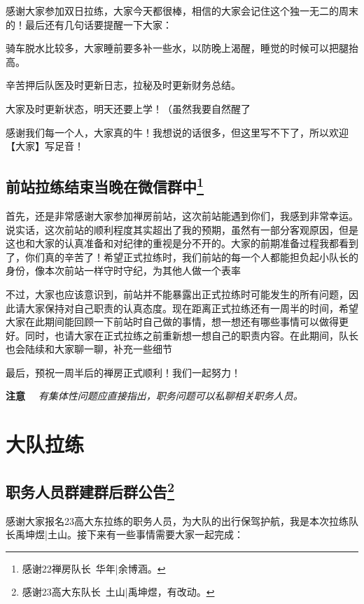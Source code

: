 \documentclass[UTF8]{ctexart}
\begin{document}
感谢大家参加双日拉练，大家今天都很棒，相信的大家会记住这个独一无二的周末的！最后还有几句话要提醒一下大家：

骑车脱水比较多，大家睡前要多补一些水，以防晚上渴醒，睡觉的时候可以把腿抬高。

辛苦押后队医及时更新日志，拉秘及时更新财务总结。

大家及时更新状态，明天还要上学！（虽然我要自然醒了

感谢我们每一个人，大家真的牛！我想说的话很多，但这里写不下了，所以欢迎【大家】写足音！

\subsection[前站拉练结束当晚在微信群中]{前站拉练结束当晚在微信群中\protect\footnote{感谢22禅房队长\ 华年|余博涵。}}

首先，还是非常感谢大家参加禅房前站，这次前站能遇到你们，我感到非常幸运。说实话，这次前站的顺利程度其实超出了我的预期，虽然有一部分客观原因，但是这也和大家的认真准备和对纪律的重视是分不开的。大家的前期准备过程我都看到了，你们真的辛苦了！希望正式拉练时，我们前站的每一个人都能担负起小队长的身份，像本次前站一样守时守纪，为其他人做一个表率

不过，大家也应该意识到，前站并不能暴露出正式拉练时可能发生的所有问题，因此请大家保持对自己职责的认真态度。现在距离正式拉练还有一周半的时间，希望大家在此期间能回顾一下前站时自己做的事情，想一想还有哪些事情可以做得更好。同时，也请大家在正式拉练之前重新想一想自己的职责内容。在此期间，队长也会陆续和大家聊一聊，补充一些细节

最后，预祝一周半后的禅房正式顺利！我们一起努力！

\textbf{注意} \ \ \textit{有集体性问题应直接指出，职务问题可以私聊相关职务人员。}

\section{大队拉练}

\subsection[职务人员群建群后群公告]{职务人员群建群后群公告\protect\footnote{感谢23高大东队长\ 土山|禹坤煜，有改动。}}

感谢大家报名23高大东拉练的职务人员，为大队的出行保驾护航，我是本次拉练队长禹坤煜|土山。接下来有一些事情需要大家一起完成：
\end{document}
